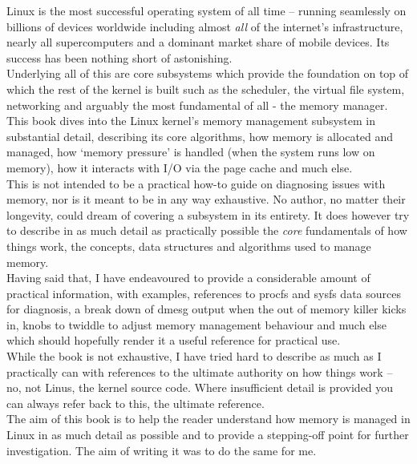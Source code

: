 Linux is the most successful operating system of all time -- running seamlessly
on billions of devices worldwide including almost \emph{all} of the
internet's infrastructure, nearly all supercomputers and a dominant market share
of mobile devices. Its success has been nothing short of astonishing.\\

Underlying all of this are core subsystems which provide the foundation on top
of which the rest of the kernel is built such as the scheduler, the virtual file
system, networking and arguably the most fundamental of all - the memory
manager.\\

This book dives into the Linux kernel's memory management subsystem in
substantial detail, describing its core algorithms, how memory is allocated and
managed, how `memory pressure' is handled (when the system runs low on memory),
how it interacts with I/O via the page cache and much else.\\

This is not intended to be a practical how-to guide on diagnosing issues with
memory, nor is it meant to be in any way exhaustive. No author, no matter their
longevity, could dream of covering a subsystem in its entirety. It does however
try to describe in as much detail as practically possible the \emph{core}
fundamentals of how things work, the concepts, data structures and algorithms
used to manage memory.\\

Having said that, I have endeavoured to provide a considerable amount of
practical information, with examples, references to procfs and sysfs data
sources for diagnosis, a break down of dmesg output when the out of memory
killer kicks in, knobs to twiddle to adjust memory management behaviour and much
else which should hopefully render it a useful reference for practical use.\\

While the book is not exhaustive, I have tried hard to describe as much as I
practically can with references to the ultimate authority on how things work --
no, not Linus, the kernel source code. Where insufficient detail is provided you
can always refer back to this, the ultimate reference.\\

The aim of this book is to help the reader understand how memory is managed in
Linux in as much detail as possible and to provide a stepping-off point for
further investigation. The aim of writing it was to do the same for me.\\

